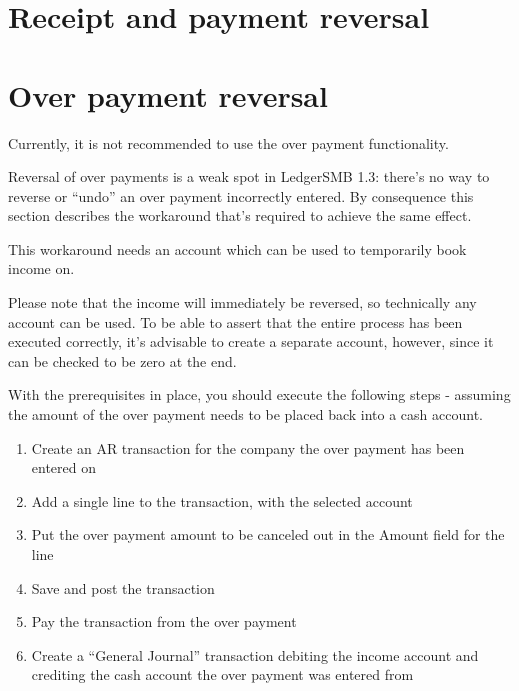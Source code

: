 \section{Receipt and payment reversal}
\label{sec-business-processes-payment-processing-reversal}

\section{Over payment reversal}
\label{sec-business-processes-payment-processing-overpayment-reversal}

Currently, it is not recommended to use the over payment functionality.

Reversal of over payments  is a weak spot in LedgerSMB 1.3: there's no way
to reverse or ``undo'' an over payment incorrectly entered.  By consequence
this section describes the workaround that's required to achieve the same
effect.

This workaround needs an account which can be used to temporarily book income on.

Please note that the income will immediately be reversed, so
technically any account can be used.  To be able to assert that the entire process
has been executed correctly, it's advisable to create a separate account, however, since
it can be checked to be zero at the end.

With the prerequisites in place, you should execute the following steps - assuming the amount
of the over payment needs to be placed back into a cash account.

\begin{enumerate}
\item \label{itm:StartSetupOverpaymentCancelation} Create an AR transaction for the
    company the over payment has been entered on
\item Add a single line to the transaction, with the selected account
\item Put the over payment amount to be canceled out in the Amount field for the line
\item \label{itm:EndSetupOverpaymentCancelation} Save and post the transaction
\item \label{itm:OverpaymentCancelation} Pay the transaction from the over payment
\item \label{itm:MoveToCashAccount} Create a ``General Journal'' transaction debiting the income account and crediting the
    cash account the over payment was entered from
\end{enumerate}

